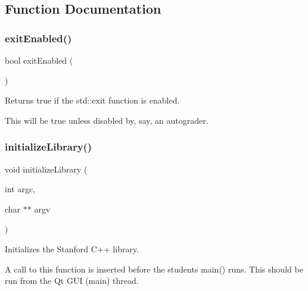 \subsection{Function Documentation}
\mbox{\label{namespacestanfordcpplib_a5bb1fbda6b82680cc8f04064e55a85c6}} 
\subsubsection{\texorpdfstring{exit\+Enabled()}{exitEnabled()}}
{\footnotesize\ttfamily bool exit\+Enabled (\begin{DoxyParamCaption}{ }\end{DoxyParamCaption})}



Returns true if the std\+::exit function is enabled. 

This will be true unless disabled by, say, an autograder. \mbox{\label{namespacestanfordcpplib_ab36f2e19ed11765f2b025cc8e4636010}} 
\subsubsection{\texorpdfstring{initialize\+Library()}{initializeLibrary()}}
{\footnotesize\ttfamily void initialize\+Library (\begin{DoxyParamCaption}\item[{int}]{argc,  }\item[{char $\ast$$\ast$}]{argv }\end{DoxyParamCaption})}



Initializes the Stanford C++ library. 

A call to this function is inserted before the student\textquotesingle{}s main() runs. This should be run from the Qt G\+UI (main) thread. \mbox{\label{namespacestanfordcpplib_a7f8902f8cc454ef116685dbc6008704a}} 
